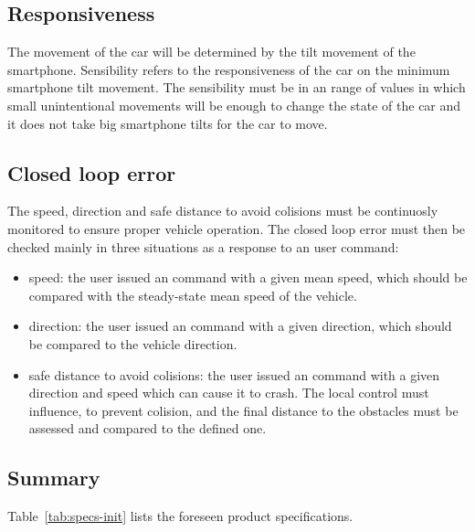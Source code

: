 \subsection{Responsiveness}%
\label{sec:org622e63a}
The movement of the car will be determined by the tilt movement of the smartphone. Sensibility refers to the responsiveness of the car on the minimum smartphone tilt movement. The sensibility must be in an range of values in which small unintentional movements will be enough to change the state of the car and it does not take big smartphone tilts for the car to move.
\subsection{Closed loop error}%
\label{sec:closed-loop-error-specs}
The speed, direction and safe distance to avoid colisions must be continuosly monitored to ensure proper vehicle operation. The closed loop error must then be checked mainly in three situations as a response to an user command:
\begin{itemize}
\item speed: the user issued an command with a given mean speed, which should be compared with the steady-state mean speed of the vehicle.
\item direction: the user issued an command with a given direction, which should be compared to the vehicle direction.
\item safe distance to avoid colisions: the user issued an command with a given direction and speed which can cause it to crash. The local control must influence, to prevent colision, and the final distance to the obstacles must be assessed and compared to the defined one.
\end{itemize}
\subsection{Summary}%
\label{sec:org1f95256}
Table~\ref{tab:specs-init} lists the foreseen product specifications.

